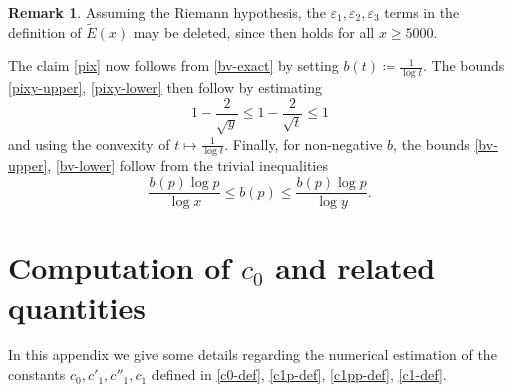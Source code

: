 \documentclass[10pt,a4paper,reqno]{amsart}
\numberwithin{equation}{section}
\theoremstyle{plain}
\theoremstyle{definition}
\newtheorem{remark}[remark]{Remark}
\newcommand\eps{\varepsilon}
\begin{document}
\begin{remark} Assuming the Riemann hypothesis, the $\eps_1, \eps_2, \eps_3$ terms in the definition of $\tilde E(x)$ may be deleted, since \cite[(7.3)]{buthe} then holds for all $x \geq 5000$.
\end{remark}

The claim \eqref{pix} now follows from \eqref{bv-exact} by setting $b(t) \coloneqq \frac{1}{\log t}$.  The bounds \eqref{pixy-upper}, \eqref{pixy-lower} then follow by estimating
$$ 1-\frac{2}{\sqrt{y}} \leq 1-\frac{2}{\sqrt{t}} \leq 1$$
and using the convexity of $t \mapsto \frac{1}{\log t}$.  Finally, for non-negative $b$, the bounds \eqref{bv-upper}, \eqref{bv-lower} follow from the trivial inequalities
$$ \frac{b(p) \log p}{\log x}  \leq b(p) \leq \frac{b(p) \log p}{\log y}.$$


\section{Computation of \texorpdfstring{$c_0$}{c\_0} and related quantities}\label{c0-app}

In this appendix we give some details regarding the numerical estimation of the constants $c_0, c'_1, c''_1, c_1$ defined in \eqref{c0-def}, \eqref{c1p-def}, \eqref{c1pp-def}, \eqref{c1-def}.
\end{document}

